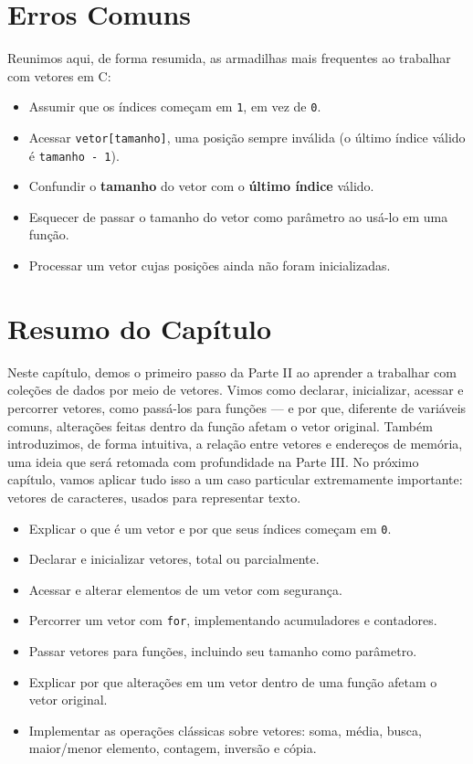 \documentclass[12pt,a4paper,oneside]{extreport}
\begin{document}
\section{Erros Comuns}

Reunimos aqui, de forma resumida, as armadilhas mais frequentes ao trabalhar com vetores em C:

\begin{itemize}
    \item Assumir que os índices começam em \texttt{1}, em vez de \texttt{0}.
    \item Acessar \texttt{vetor[tamanho]}, uma posição sempre inválida (o último índice válido é \texttt{tamanho - 1}).
    \item Confundir o \textbf{tamanho} do vetor com o \textbf{último índice} válido.
    \item Esquecer de passar o tamanho do vetor como parâmetro ao usá-lo em uma função.
    \item Processar um vetor cujas posições ainda não foram inicializadas.
\end{itemize}

\section*{Resumo do Capítulo}
Neste capítulo, demos o primeiro passo da Parte II ao aprender a trabalhar com coleções de dados por meio de vetores. Vimos como declarar, inicializar, acessar e percorrer vetores, como passá-los para funções — e por que, diferente de variáveis comuns, alterações feitas dentro da função afetam o vetor original. Também introduzimos, de forma intuitiva, a relação entre vetores e endereços de memória, uma ideia que será retomada com profundidade na Parte III. No próximo capítulo, vamos aplicar tudo isso a um caso particular extremamente importante: vetores de caracteres, usados para representar texto.

\begin{tcolorbox}[title={Ao final deste capítulo, você deve ser capaz de:}]
\begin{itemize}
    \item Explicar o que é um vetor e por que seus índices começam em \texttt{0}.
    \item Declarar e inicializar vetores, total ou parcialmente.
    \item Acessar e alterar elementos de um vetor com segurança.
    \item Percorrer um vetor com \texttt{for}, implementando acumuladores e contadores.
    \item Passar vetores para funções, incluindo seu tamanho como parâmetro.
    \item Explicar por que alterações em um vetor dentro de uma função afetam o vetor original.
    \item Implementar as operações clássicas sobre vetores: soma, média, busca, maior/menor elemento, contagem, inversão e cópia.
\end{itemize}
\end{tcolorbox}
\end{document}
